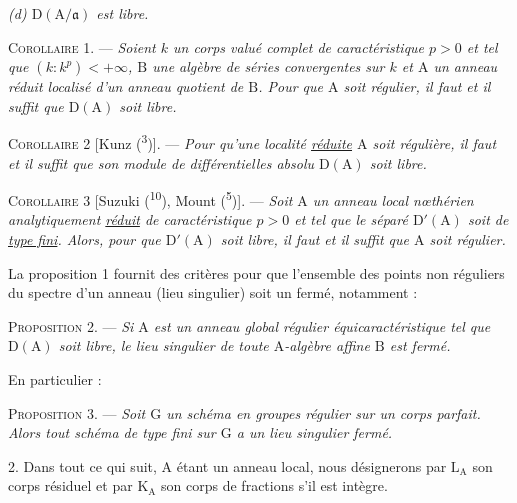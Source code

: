 \textit{(d) $\mathrm D(\mathrm A/\mathfrak a)$ est libre.}

\textsc{Corollaire 1.} --- \textit{Soient $k$ un corps valué complet de caractéristique $p>0$ et tel que $(k:k^{p})<+\infty$, $\mathrm B$ une algèbre de séries convergentes sur $k$ et $\mathrm A$ un anneau réduit localisé d’un anneau quotient de $\mathrm B$. Pour que $\mathrm A$ soit régulier, il faut et il suffit que $\mathrm D(\mathrm A)$ soit libre.}

\textsc{Corollaire 2} [Kunz (\textsuperscript{3})]. --- \textit{Pour qu’une localité \uline{réduite} $\mathrm A$ soit régulière, il faut et il suffit que son module de différentielles absolu $\mathrm D(\mathrm A)$ soit libre.}

\textsc{Corollaire 3} [Suzuki (\textsuperscript{10}), Mount (\textsuperscript{5})]. --- \textit{Soit $\mathrm A$ un anneau local nœthérien analytiquement \uline{réduit} de caractéristique $p>0$ et tel que le séparé $\mathrm D'(\mathrm A)$ soit de \uline{type fini}. Alors, pour que $\mathrm D'(\mathrm A)$ soit libre, il faut et il suffit que $\mathrm A$ soit régulier.}

La proposition 1 fournit des critères pour que l’ensemble des points non réguliers du spectre d’un anneau (lieu singulier) soit un fermé, notamment :

\margin{\handwritten{$\left.\rule{0pt}{2em}\right]$}}\textsc{Proposition 2.} --- \textit{Si $\mathrm A$ est un anneau global régulier équicaractéristique tel que $\mathrm D(\mathrm A)$ soit libre, le lieu singulier de toute $\mathrm A$-algèbre affine $\mathrm B$ est fermé.}

En particulier :

\textsc{Proposition 3.} --- \textit{Soit $\mathrm G$ un schéma en groupes régulier sur un corps parfait. Alors tout schéma de type fini sur $\mathrm G$ a un lieu singulier fermé.}

2. Dans tout ce qui suit, $\mathrm A$ étant un anneau local, nous désignerons par $\mathrm L_{\mathrm A}$ son corps résiduel et par $\mathrm K_{\mathrm A}$ son corps de fractions s’il est intègre.

